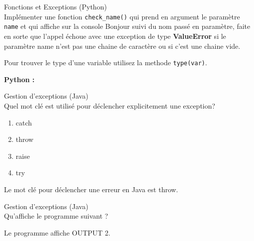 \begin{Exercice}[10 minutes]Fonctions et Exceptions (Python)\\

    Implémenter une fonction \lstinline{check_name()} qui prend en argument le paramètre \lstinline{name} et qui affiche 
    sur la console Bonjour suivi du nom passé en paramètre, faite en sorte que l'appel échoue avec une exception de type 
    \textbf{ValueError} si le 
    paramètre name n'est pas une chaine de caractère ou si c'est une chaine vide.
    
    \begin{conseil}
       Pour trouver le type d'une variable utilisez la methode \lstinline{type(var)}.
    \end{conseil}
    
    
    
    \begin{solution}   
    \textbf{Python :} \\
    
        
        
        
    \end{solution}
    
    \end{Exercice}

\begin{Exercice}[5 minutes]Gestion d'exceptions (Java)\\

    Quel mot clé est utilisé pour déclencher explicitement une exception?

    \begin{enumerate}
        \item catch
        \item throw
        \item raise 
        \item try
    \end{enumerate}
    
      
        
        \begin{solution}   
        Le mot clé pour déclencher une erreur en Java est throw.
            
        \end{solution}
        
 \end{Exercice}

 \begin{Exercice}[5 minutes]Gestion d'exceptions (Java)\\

    Qu'affiche le programme suivant ?
    

    
        
        \begin{solution}   
        Le programme affiche OUTPUT 2.             
        \end{solution}
        
 \end{Exercice}



